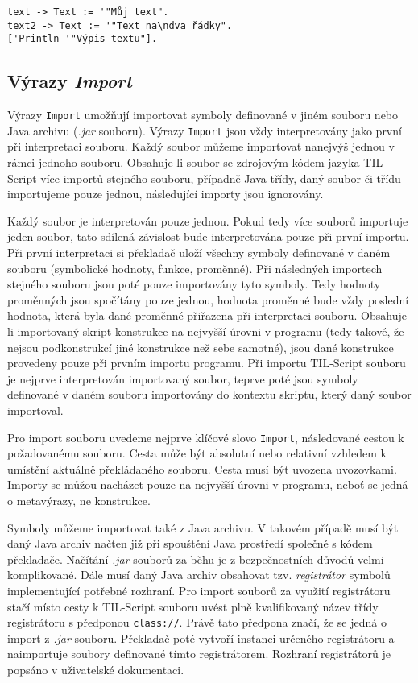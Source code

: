 \begin{lstlisting}[caption={Příklad využití typu Text}]
text -> Text := '"Můj text".
text2 -> Text := '"Text na\ndva řádky".
['Println '"Výpis textu"].
\end{lstlisting}

\subsection{Výrazy \textit{Import}}\label{import-statement}

Výrazy \lstinline{Import} umožňují importovat symboly definované v jiném souboru nebo Java archivu
(\textit{.jar} souboru). Výrazy \lstinline{Import} jsou vždy interpretovány jako první při
interpretaci souboru. Každý soubor můžeme importovat nanejvýš jednou v rámci jednoho souboru.
Obsahuje-li soubor se zdrojovým kódem jazyka TIL-Script více importů stejného souboru, případně Java
třídy, daný soubor či třídu importujeme pouze jednou, následující importy jsou ignorovány.

Každý soubor je interpretován pouze jednou. Pokud tedy více souborů importuje jeden soubor, tato
sdílená závislost bude interpretována pouze při první importu. Při první interpretaci si překladač
uloží všechny symboly definované v daném souboru (symbolické hodnoty, funkce, proměnné).
Při následných importech stejného souboru jsou poté pouze importovány tyto symboly. Tedy hodnoty
proměnných jsou spočítány pouze jednou, hodnota proměnné bude vždy poslední hodnota, která byla
dané proměnné přiřazena při interpretaci souboru. Obsahuje-li importovaný skript konstrukce
na nejvyšší úrovni v programu (tedy takové, že nejsou podkonstrukcí jiné konstrukce než sebe
samotné), jsou dané konstrukce provedeny pouze při prvním importu programu. Při importu TIL-Script
souboru je nejprve interpretován importovaný soubor, teprve poté jsou symboly definované v daném
souboru importovány do kontextu skriptu, který daný soubor importoval.

Pro import souboru uvedeme nejprve klíčové slovo \lstinline{Import}, následované cestou
k požadovanému souboru. Cesta může být absolutní nebo relativní vzhledem k umístění aktuálně
překládaného souboru. Cesta musí být uvozena uvozovkami. Importy se můžou nacházet pouze na nejvyšší
úrovni v programu, neboť se jedná o metavýrazy, ne konstrukce.

Symboly můžeme importovat také z Java archivu. V takovém případě musí být daný Java archiv načten
již při spouštění Java prostředí společně s kódem překladače. Načítání \textit{.jar} souborů
za běhu je z bezpečnostních důvodů velmi komplikované. Dále musí daný Java archiv obsahovat tzv.
\textit{registrátor} symbolů implementující potřebné rozhraní. Pro import souborů
za využití registrátoru stačí místo cesty k TIL-Script souboru uvést plně kvalifikovaný název
třídy registrátoru s předponou \lstinline{class://}. Právě tato předpona značí, že se jedná o
import z \textit{.jar} souboru. Překladač poté vytvoří instanci určeného registrátoru a naimportuje
soubory definované tímto registrátorem. Rozhraní registrátorů je popsáno v uživatelské dokumentaci.

